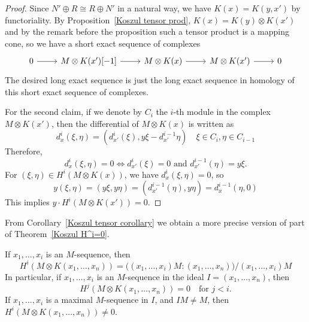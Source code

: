 \begin{proof}
Since $N'\oplus R\cong R\oplus N'$ in a natural way, we have $K(x)=K(y,x')$ by functoriality. By Proposition~\ref{Koszul tensor prod}, $K(x)=K(y)\otimes K(x')$ and by the remark before the proposition such a tensor product is a mapping cone, so we have a short exact sequence of complexes
\[\begin{tikzcd}
0\ar[r]&M\otimes K(x')[-1]\ar[r]&M\otimes K(x)\ar[r]&M\otimes K(x')\ar[r]&0
\end{tikzcd}\]
The desired long exact sequence is just the long exact sequence in homology of this short exact sequence of complexes.\par
For the second claim, if we denote by $C_i$ the $i$-th module in the complex $M\otimes K(x')$, then the differential of $M\otimes K(x)$ is written as
\[d_x^i(\xi,\eta)=(d^i_{x'}(\xi),y\xi-d^{i-1}_{x'}\eta)\quad \xi\in C_i,\eta\in C_{i-1}\]
Therefore, 
\[d_{x}^i(\xi,\eta)=0\iff d^i_{x'}(\xi)=0\text{ and }d^{i-1}_{x'}(\eta)=y\xi.\]
For $(\xi,\eta)\in H^i(M\otimes K(x))$, we have $d_x^i(\xi,\eta)=0$, so
\[y(\xi,\eta)=(y\xi,y\eta)=(d^{i-1}_{x'}(\eta),y\eta)=d^{i-1}_x(\eta,0)\]
This implies $y\cdot H^i(M\otimes K(x'))=0$.
\end{proof}
From Corollary~\ref{Koszul tensor corollary} we obtain a more precise version of part of Theorem~\ref{Koszul H^i=0}.
\begin{corollary}\label{Koszul regular H^i=}
If $x_1,\dots,x_i$ is an $M$-sequence, then
\[H^i(M\otimes K(x_1,\dots,x_n))=\big((x_1,\dots,x_i)M:(x_1,\dots,x_n)\big)/(x_1,\dots,x_i)M\]
In particular, if $x_1,\dots,x_i$ is an $M$-sequence in the ideal $I=(x_1,\dots,x_n)$, then 
\[H^j(M\otimes K(x_1,\dots,x_n))=0\quad\text{for }j<i.\] 
If $x_1,\dots,x_i$ is a maximal $M$-sequence in $I$, and $IM\neq M$, then $H^i(M\otimes K(x_1,\dots,x_n))\neq 0$.
\end{corollary}
